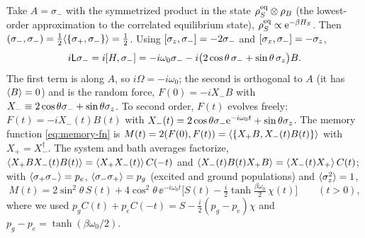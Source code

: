 \begin{exbox}[Example 8.1: $A=\sigma_-$ and the retarded self-energy]
Take $A=\sigma_-$ with the symmetrized product in the state $\rho_S^{\rm eq}\otimes\rho_{B}$ (the lowest-order approximation to the correlated equilibrium state), $\rho_S^{\rm eq}\propto\mathrm{e}^{-\beta H_S}$.
Then $(\sigma_-,\sigma_-)=\tfrac12\langle\{\sigma_+,\sigma_-\}\rangle=\tfrac12$.
Using $[\sigma_z,\sigma_-]=-2\sigma_-$ and $[\sigma_x,\sigma_-]=-\sigma_z$,
\begin{equation}
  i\mathsf L\sigma_-=i[H,\sigma_-]=-i\omega_0\sigma_--i\big(2\cos\theta\,\sigma_-+\sin\theta\,\sigma_z\big)B .
\end{equation}
The first term is along $A$, so $i\Omega=-i\omega_0$; the second is orthogonal to $A$ (it has $\langle B\rangle=0$) and is the random force, $F(0)=-iX_-B$ with $X_-\equiv2\cos\theta\sigma_-+\sin\theta\sigma_z$.
To second order, $F(t)$ evolves freely: $F(t)=-iX_-(t)B(t)$ with $X_-(t)=2\cos\theta\sigma_-\mathrm{e}^{-i\omega_0t}+\sin\theta\sigma_z$.
The memory function \eqref{eq:memory-fn} is $M(t)=2(F(0),F(t))=\langle\{X_+B,X_-(t)B(t)\}\rangle$ with $X_+=X_-^\dagger$.
The system and bath averages factorize, $\langle X_+BX_-(t)B(t)\rangle=\langle X_+X_-(t)\rangle\,C(-t)$ and $\langle X_-(t)B(t)X_+B\rangle=\langle X_-(t)X_+\rangle\,C(t)$; with $\langle\sigma_+\sigma_-\rangle=p_e$, $\langle\sigma_-\sigma_+\rangle=p_g$ (excited and ground populations) and $\langle\sigma_z^2\rangle=1$,
\begin{equation}
  M(t)=2\sin^2\theta\,S(t)+4\cos^2\theta\,\ee^{-i\omega_0t}\Big[S(t)-\tfrac i2\tanh\tfrac{\beta\omega_0}{2}\,\chi(t)\Big]\qquad(t>0),
  \label{eq:M-qubit}
\end{equation}
where we used $p_gC(t)+p_eC(-t)=S-\tfrac i2(p_g-p_e)\chi$ and $p_g-p_e=\tanh(\beta\omega_0/2)$.


\end{exbox}
